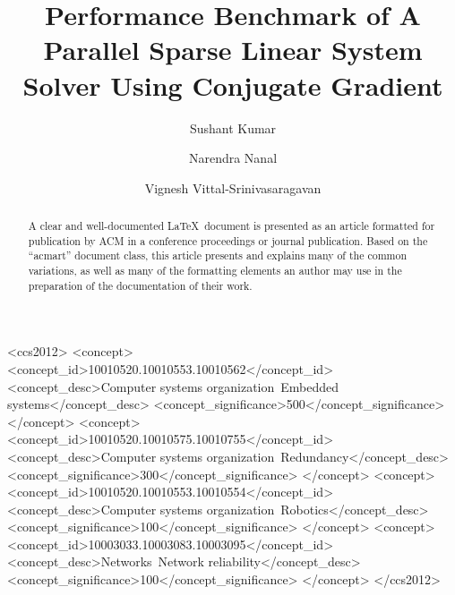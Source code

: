 \documentclass[sigplan,screen]{acmart}
\begin{document}
\title{Performance Benchmark of A Parallel Sparse Linear System Solver Using Conjugate Gradient}

\author{Sushant Kumar}
\authornotemark[1]

\author{Narendra Nanal}
\authornotemark[2]

\author{Vignesh Vittal-Srinivasaragavan}
\authornotemark[3]


\begin{abstract}
  A clear and well-documented \LaTeX\ document is presented as an
  article formatted for publication by ACM in a conference proceedings
  or journal publication. Based on the ``acmart'' document class, this
  article presents and explains many of the common variations, as well
  as many of the formatting elements an author may use in the
  preparation of the documentation of their work.
\end{abstract}

%

\begin{CCSXML}
<ccs2012>
 <concept>
  <concept_id>10010520.10010553.10010562</concept_id>
  <concept_desc>Computer systems organization~Embedded systems</concept_desc>
  <concept_significance>500</concept_significance>
 </concept>
 <concept>
  <concept_id>10010520.10010575.10010755</concept_id>
  <concept_desc>Computer systems organization~Redundancy</concept_desc>
  <concept_significance>300</concept_significance>
 </concept>
 <concept>
  <concept_id>10010520.10010553.10010554</concept_id>
  <concept_desc>Computer systems organization~Robotics</concept_desc>
  <concept_significance>100</concept_significance>
 </concept>
 <concept>
  <concept_id>10003033.10003083.10003095</concept_id>
  <concept_desc>Networks~Network reliability</concept_desc>
  <concept_significance>100</concept_significance>
 </concept>
</ccs2012>
\end{CCSXML}
\end{document}
